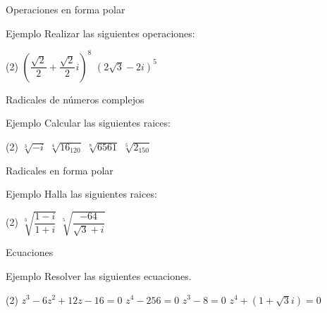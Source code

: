 \documentclass[8pt]{beamer}
\begin{document}
\begin{frame}[t]{Operaciones en forma polar}
\begin{exampleblock}{Ejemplo}
Realizar las siguientes operaciones:
\begin{tasks}[label=\alph*)](2)
\task $\left( \dfrac{\sqrt{2}}{2}+ \dfrac{\sqrt{2}}{2} i\right)^8$
\task $\left( 2\sqrt{3}-2i \right)^5 $
\end{tasks}
\end{exampleblock}
\end{frame}


\begin{frame}[t]{Radicales de números complejos}
\begin{exampleblock}{Ejemplo}
Calcular las siguientes raices:
\begin{tasks}[label=\alph*)](2)
\task $\sqrt[3]{-i}$
\task $\sqrt[4]{16_{120}}$
\task $\sqrt[8]{6561}$
\task $\sqrt[5]{2_{150}}$
\end{tasks}
\end{exampleblock}
\end{frame}

\begin{frame}[t]{Radicales en forma polar}
\begin{exampleblock}{Ejemplo}
Halla las siguientes raices:
\begin{tasks}[label=\alph*)](2)	
\task $\sqrt[3]{\dfrac{1-i}{1+i}}$
\task $\sqrt[5]{\dfrac{-64}{\sqrt{3}+i}}$
\end{tasks}
\end{exampleblock}
\end{frame}

\begin{frame}[t]{Ecuaciones}
\begin{exampleblock}{Ejemplo}
Resolver las siguientes ecuaciones.
\begin{tasks}[label=\alph*)](2)
\task $z^3-6z^2+12z-16=0$
\task $z^4 -256 =0 $
\task $z^3-8=0$
\task $z^4+\left(1+\sqrt{3}i\right)=0$
\end{tasks}
\end{exampleblock}
\end{frame}
\end{document}
